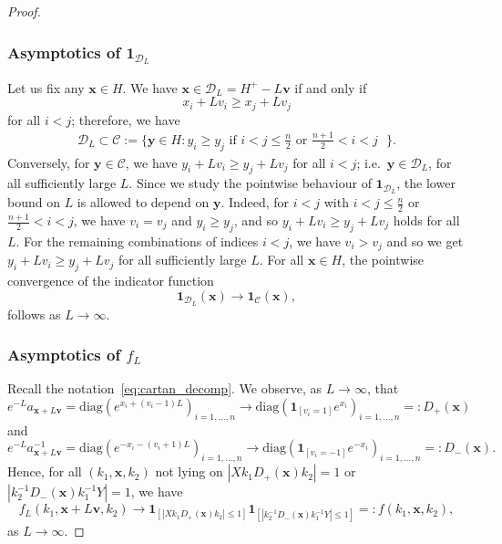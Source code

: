 \documentclass[11pt,reqno]{amsart}
\theoremstyle{definition}
\theoremstyle{remark}
\numberwithin{equation}{section}
\numberwithin{thm}{section}
\numberwithin{table}{section}
\newcommand{\y}{\mathbf{y}}
\newcommand{\x}{\mathbf{x}}
\begin{document}
\begin{proof}
\subsubsection*{Asymptotics of $\mathbf{1}_{\mathcal{D}_L}$}
    Let us fix any $\mathbf{x} \in H$. We have $\mathbf{x} \in \mathcal{D}_L = H^{+}-L\mathbf{v}$ if and only if 
    \[
        x_i + L v_i
        \ge 
        x_j + L v_j
    \]
    for all $i < j$; therefore, we have
    \begin{align}\label{eq:domoconDL}
        \mathcal{D}_L  \subset \mathcal{C}  :=
    \{
    \mathbf{y} \in H: y_i \ge y_j \text{ if $i < j \le \tfrac{n}{2}$ or $\tfrac{n+1}{2} < i <j$ } \}.
    \end{align}
     Conversely, for $\y \in \mathcal{C}$, we have $y_i + Lv_i \ge y_j + L v_j$ for all $i<j$;
      i.e.\ $\y \in \mathcal{D}_{L}$, 
     for all sufficiently large $L$. Since we study the pointwise behaviour of $\mathbf{1}_{\mathcal{D}_{L}}$, the lower bound on $L$ is allowed to depend on $\y$. 
     Indeed, for $i<j$ with $i < j \le \tfrac{n}{2}$ or $\tfrac{n+1}{2} < i <j$, we have $v_i = v_j$ and $y_i \ge y_j$, and so
      $y_i + L v_i \ge y_j + Lv_j$ holds for all $L$. For the remaining combinations of indices $i<j$, we have  $v_i > v_j$ and so we get $y_i + L v_i \ge y_j + Lv_j$  for all sufficiently large $L$.
    For all $\mathbf{x} \in H$, 
     the pointwise convergence of the indicator function
    \[
    \mathbf{1}_{\mathcal{D}_L}(\x) \to \mathbf{1}_{\mathcal{C}}(\x), 
    \]
    follows as $L \to \infty$.

\subsubsection*{Asymptotics of $f_L$} Recall the notation~\eqref{eq:cartan_decomp}. 
   We observe, as $L \to \infty$, that 
      \begin{equation}\label{eq:defofD+}
          e^{-L} a_{\mathbf{x}+L\mathbf{v}} = \mathrm{diag}(
      e^{x_i + (v_i - 1)L }
      )_{i=1,\ldots,n} \to \mathrm{diag}
      (
      \mathbf{1}_{[v_i=1]} e^{x_i  }
      )_{i=1,\ldots,n} =: D_+(\mathbf{x}) 
      \end{equation}
      and
        \begin{equation}\label{eq:defofD-}
      e^{-L} a_{\mathbf{x}+L\mathbf{v}}^{-1} = \mathrm{diag}(
      e^{-x_i - (v_i + 1)L }
      )_{i=1,\ldots,n} \to \mathrm{diag}
      (
      \mathbf{1}_{[v_i=-1]} e^{-x_i  }
      )_{i=1,\ldots,n} =: D_{-}(\mathbf{x}).
        \end{equation}
      Hence, for all $(k_1,\mathbf{x},k_2)$ not lying on $| X k_1 D_+(\mathbf{x}) k_2|=1$ or $|  k_2^{-1} D_-(\mathbf{x}) k_1^{-1} Y |=1$, we have  
     \begin{equation}
     \label{eq:f(k_1,x,k_2)}
       f_L(k_1,\mathbf{x}+L\mathbf{v},k_2) 
       \to \mathbf{1}_{[| X k_1 D_+(\mathbf{x}) k_2|\le 1]} 
        \mathbf{1}_{[|  k_2^{-1} D_-(\mathbf{x}) k_1^{-1} Y |\le 1]} =: f(k_1,\mathbf{x},k_2) ,
    \end{equation}
      as $L \to \infty$.
      

\end{proof}
\end{document}
